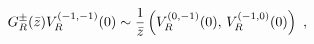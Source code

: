 \begin{equation}
G_R^{\pm}(\bar{z})V_R^{(-1,-1)}(0)\sim {1\over \bar{z}}\left(
V_R^{(0,-1)}(0),\,V_R^{(-1,0)}(0)\right) \ ,
\end{equation}


